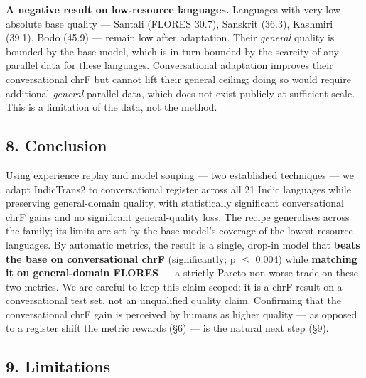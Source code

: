 \documentclass[
  11pt,
]{article}
\begin{document}
\textbf{A negative result on low-resource languages.} Languages with
very low absolute base quality --- Santali (FLORES 30.7), Sanskrit
(36.3), Kashmiri (39.1), Bodo (45.9) --- remain low after adaptation.
Their \emph{general} quality is bounded by the base model, which is in
turn bounded by the scarcity of any parallel data for these languages.
Conversational adaptation improves their conversational chrF but cannot
lift their general ceiling; doing so would require additional
\emph{general} parallel data, which does not exist publicly at
sufficient scale. This is a limitation of the data, not the method.

\hypertarget{conclusion}{%
\subsection{8. Conclusion}\label{conclusion}}

Using experience replay and model souping --- two established techniques
--- we adapt IndicTrans2 to conversational register across all 21 Indic
languages while preserving general-domain quality, with statistically
significant conversational chrF gains and no significant general-quality
loss. The recipe generalises across the family; its limits are set by
the base model's coverage of the lowest-resource languages. By automatic
metrics, the result is a single, drop-in model that \textbf{beats the
base on conversational chrF} (significantly; p $\le$ 0.004) while
\textbf{matching it on general-domain FLORES} --- a strictly
Pareto-non-worse trade on these two metrics. We are careful to keep this
claim scoped: it is a chrF result on a conversational test set, not an
unqualified quality claim. Confirming that the conversational chrF gain
is perceived by humans as higher quality --- as opposed to a register
shift the metric rewards (§6) --- is the natural next step (§9).

\hypertarget{limitations}{%
\subsection{9. Limitations}\label{limitations}}
\end{document}
